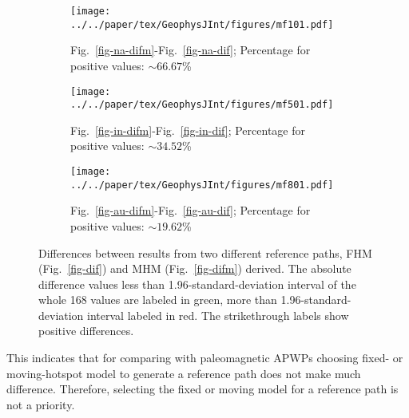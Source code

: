 \begin{figure*}
  \centering
  \begin{subfigure}{1.01\textwidth}
    \texttt{[image: ../../paper/tex/GeophysJInt/figures/mf101.pdf]}
    \caption{Fig.~\ref{fig-na-difm}-Fig.~\ref{fig-na-dif}; Percentage for
      positive values: ${\sim}66.67$\%}\label{fig-mf101}
  \end{subfigure}
  \vspace{.1em}
  \begin{subfigure}{1.01\textwidth}
    \texttt{[image: ../../paper/tex/GeophysJInt/figures/mf501.pdf]}
    \caption{Fig.~\ref{fig-in-difm}-Fig.~\ref{fig-in-dif}; Percentage for
      positive values: ${\sim}34.52$\%}\label{fig-mf501}
  \end{subfigure}
  \vspace{.1em}
  \begin{subfigure}{1.01\textwidth}
    \texttt{[image: ../../paper/tex/GeophysJInt/figures/mf801.pdf]}
    \caption{Fig.~\ref{fig-au-difm}-Fig.~\ref{fig-au-dif}; Percentage for
      positive values: ${\sim}19.62$\%}\label{fig-mf801}
  \end{subfigure}
  \caption[Differences between results from FHM and MHM]{Differences between
    results from two different reference paths, FHM (Fig.~\ref{fig-dif}) and MHM
    (Fig.~\ref{fig-difm}) derived. The absolute difference values less than
    1.96-standard-deviation interval of the whole 168 values are labeled in
    green, more than 1.96-standard-deviation interval labeled in red. The
    strikethrough labels show positive differences.}\label{fig-dmf}
\end{figure*}

This indicates that for comparing with paleomagnetic APWPs choosing fixed- or
moving-hotspot model to generate a reference path does not make much difference.
Therefore, selecting the fixed or moving model for a reference path is not a
priority.

